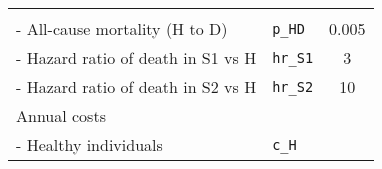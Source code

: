 \documentclass[]{article}
\begin{document}
\begin{longtable}[]{@{}llc@{}}
\begin{minipage}[t]{0.20\columnwidth}
\strut
\end{minipage}\tabularnewline
\begin{minipage}[t]{0.47\columnwidth}\raggedright\strut
- All-cause mortality (H to D)\strut
\end{minipage} & \begin{minipage}[t]{0.18\columnwidth}\raggedright\strut
\texttt{p\_HD}\strut
\end{minipage} & \begin{minipage}[t]{0.20\columnwidth}\centering\strut
0.005\strut
\end{minipage}\tabularnewline
\begin{minipage}[t]{0.47\columnwidth}\raggedright\strut
- Hazard ratio of death in S1 vs H\strut
\end{minipage} & \begin{minipage}[t]{0.18\columnwidth}\raggedright\strut
\texttt{hr\_S1}\strut
\end{minipage} & \begin{minipage}[t]{0.20\columnwidth}\centering\strut
3\strut
\end{minipage}\tabularnewline
\begin{minipage}[t]{0.47\columnwidth}\raggedright\strut
- Hazard ratio of death in S2 vs H\strut
\end{minipage} & \begin{minipage}[t]{0.18\columnwidth}\raggedright\strut
\texttt{hr\_S2}\strut
\end{minipage} & \begin{minipage}[t]{0.20\columnwidth}\centering\strut
10\strut
\end{minipage}\tabularnewline
\begin{minipage}[t]{0.47\columnwidth}\raggedright\strut
Annual costs\strut
\end{minipage} & \begin{minipage}[t]{0.18\columnwidth}\raggedright\strut
\strut
\end{minipage} & \begin{minipage}[t]{0.20\columnwidth}\centering\strut
\strut
\end{minipage}\tabularnewline
\begin{minipage}[t]{0.47\columnwidth}\raggedright\strut
- Healthy individuals\strut
\end{minipage} & \begin{minipage}[t]{0.18\columnwidth}\raggedright\strut
\texttt{c\_H}\strut
\end{minipage} & \begin{minipage}[t]{0.20\columnwidth}\centering\strut

\end{minipage}
\end{longtable}
\end{document}
